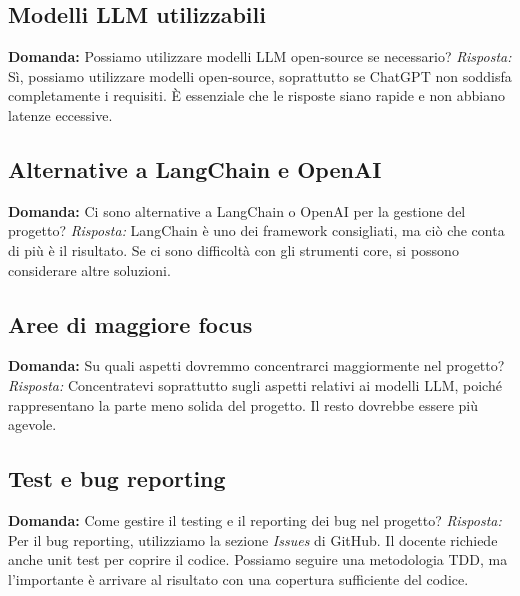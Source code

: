 \documentclass{article}
\begin{document}
\subsection{Modelli LLM utilizzabili} \textbf{Domanda:} Possiamo utilizzare modelli LLM open-source se necessario?
\newline
\textit{Risposta:} Sì, possiamo utilizzare modelli open-source, soprattutto se ChatGPT non soddisfa completamente i requisiti. È essenziale che le risposte siano rapide e non abbiano latenze eccessive.

\subsection{Alternative a LangChain e OpenAI} \textbf{Domanda:} Ci sono alternative a LangChain o OpenAI per la gestione del progetto?
\newline
\textit{Risposta:} LangChain è uno dei framework consigliati, ma ciò che conta di più è il risultato. Se ci sono difficoltà con gli strumenti core, si possono considerare altre soluzioni.

\subsection{Aree di maggiore focus} \textbf{Domanda:} Su quali aspetti dovremmo concentrarci maggiormente nel progetto?
\newline
\textit{Risposta:} Concentratevi soprattutto sugli aspetti relativi ai modelli LLM, poiché rappresentano la parte meno solida del progetto. Il resto dovrebbe essere più agevole.

\subsection{Test e bug reporting} \textbf{Domanda:} Come gestire il testing e il reporting dei bug nel progetto?
\newline
\textit{Risposta:} Per il bug reporting, utilizziamo la sezione \textit{Issues} di GitHub. Il docente richiede anche unit test per coprire il codice. Possiamo seguire una metodologia TDD, ma l'importante è arrivare al risultato con una copertura sufficiente del codice.
\end{document}
